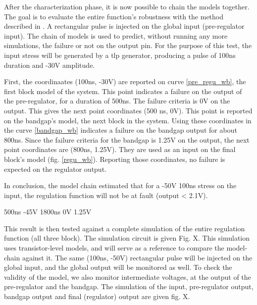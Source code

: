 After the characterization phase, it is now possible to chain the models together.
The goal is to evaluate the entire function's robustness with the method described in \label{sec:block-chaining}.
A rectangular pulse is injected on the global input (pre-regulator input).
The chain of models is used to predict, without running any more simulations, the failure or not on the output pin.
For the purpose of this test, the input stress will be generated by a \gls{tlp} generator, producing a pulse of 100ns duration and -30V amplitude.

First, the coordinaates (100ns, -30V) are reported on curve \ref{pre_regu_wb}, the first block model of the system.
This point indicates a failure on the output of the pre-regulator, for a duration of 500ns.
The failure criteria is 0V on the output.
This gives the next point coordinates (500 ns, 0V).
This point is reported on the bandgap's model, the next block in the system.
Using these coordinates in the curve \ref{bandgap_wb} indicates a failure on the bandgap output for about 800ns.
Since the failure criteria for the bandgap is 1.25V on the output, the next point coordinates are (800ns, 1.25V).
They are used as an input on the final block's model (fig. \ref{regu_wb}).
Reporting those coordinates, no failure is expected on the regulator output.

In conclusion, the model chain estimated that for a -50V 100ns stress on the input, the regulation function will not be at fault (output < 2.1V).

500ns -45V
1800ns 0V
 1.25V



This result is then tested against a complete simulation of the entire regulation function (all three block).
The simulation circuit is given Fig. X.
This simulation uses transistor-level models, and will serve as a reference to compare the model-chain against it.
The same (100ns, -50V) rectangular pulse will be injected on the global input, and the global output will be monitored as well.
To check the validity of the model, we also monitor intermediate voltages, at the output of the pre-regulator and the bandgap.
The simulation of the input, pre-regulator output, bandgap output and final (regulator) output are given fig. X.


